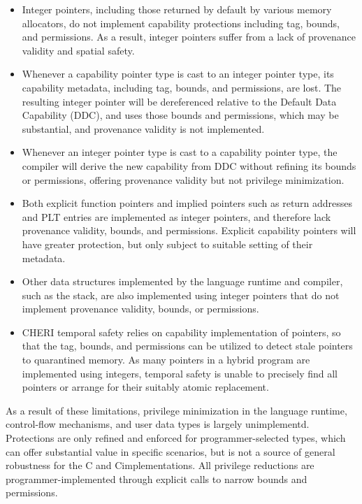 \documentclass[12pt,twoside,openright,a4paper]{article}
\newcommand{\note}[2]{{\color{blue}[ Note: #1 - #2]}}
\renewcommand{\note}[2]{\relax\ifhmode\unskip\fi}
\newcommand{\nwfnote}[1]{\note{#1}{nwf}}
\newcommand*{\cpp}{\texorpdfstring{C\textsmaller[2]{\protect\nolinebreak[4]\hspace{-.05em}\raisebox{.45ex}{\textbf{++}}}}{C++}}
\begin{document}
\begin{itemize}
\item Integer pointers, including those returned by default by various memory allocators, do
  not implement capability protections including tag, bounds, and permissions.
  As a result, integer pointers suffer from a lack of provenance validity and
  spatial safety.

\item Whenever a capability pointer type is cast to an integer pointer type,
  its capability metadata, including tag, bounds, and permissions, are lost.
  The resulting integer pointer will be dereferenced relative to the Default
  Data Capability (DDC), and uses those bounds and permissions, which may be
  substantial, and provenance validity is not implemented.

  \nwfnote{Casts to integers of tag-clear capabilities trap or succeed?}

\item Whenever an integer pointer type is cast to a capability pointer type,
  the compiler will derive the new capability from DDC without refining its
  bounds or permissions, offering provenance validity but not privilege
  minimization.

\item Both explicit function pointers and implied pointers such as return
  addresses and PLT entries are implemented as integer pointers, and therefore
  lack provenance validity, bounds, and permissions.
  Explicit capability pointers will have greater protection, but only subject
  to suitable setting of their metadata.

\item Other data structures implemented by the language runtime and compiler,
  such as the stack, are also implemented using integer pointers that do not
  implement provenance validity, bounds, or permissions.

\item CHERI temporal safety relies on capability implementation of pointers,
  so that the tag, bounds, and permissions can be utilized to detect stale
  pointers to quarantined memory.
  As many pointers in a hybrid program are implemented using integers,
  temporal safety is unable to precisely find all pointers or arrange for
  their suitably atomic replacement.
\end{itemize}

As a result of these limitations, privilege minimization in the language
runtime, control-flow mechanisms, and user data types is largely unimplementd.
Protections are only refined and enforced for programmer-selected types, which
can offer substantial value in specific scenarios, but is not a source of
general robustness for the C and \cpp implementations.
All privilege reductions are programmer-implemented through explicit calls to
narrow bounds and permissions.
\end{document}
